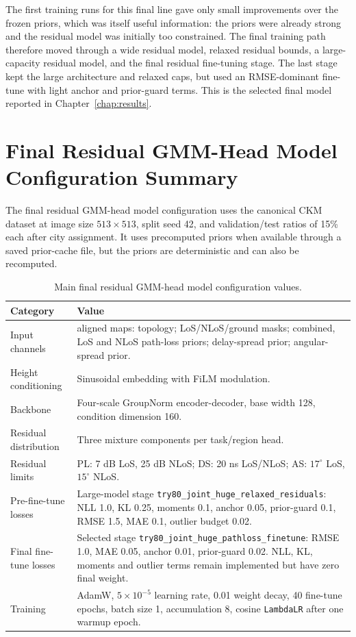 The first training runs for this final line gave only small improvements over the frozen
priors, which was itself useful information: the priors were already strong
and the residual model was initially too constrained. The final training path
therefore moved through a wide residual model, relaxed residual bounds, a
large-capacity residual model, and the final residual fine-tuning stage. The
last stage kept the large architecture and relaxed caps, but used an
RMSE-dominant fine-tune with light anchor and prior-guard terms. This is the
selected final model reported in Chapter~\ref{chap:results}.

\chapter{Final Residual GMM-Head Model Configuration Summary}

The final residual GMM-head model configuration uses the canonical CKM dataset at image
size \(513\times513\), split seed 42, and validation/test ratios of 15\% each
after city assignment. It uses
precomputed priors when available through a saved prior-cache file, but the
priors are deterministic and can also be recomputed.

\begin{table}[H]
\centering
\caption{Main final residual GMM-head model configuration values.}
\label{tab:try80_config_appendix}
\begingroup
\footnotesize
\setlength{\tabcolsep}{5pt}
\renewcommand{\arraystretch}{1.16}
\begin{tabularx}{\textwidth}{@{}>{\raggedright\arraybackslash}p{3.15cm}>{\raggedright\arraybackslash}X@{}}
\toprule
Category & Value \\
\midrule
Input channels & 9 aligned maps: topology; LoS/NLoS/ground masks; combined,
LoS and NLoS path-loss priors; delay-spread prior; angular-spread prior. \\
Height conditioning & Sinusoidal embedding with FiLM modulation. \\
Backbone & Four-scale GroupNorm encoder-decoder, base width 128, condition
dimension 160. \\
Residual distribution & Three mixture components per task/region head. \\
Residual limits & PL: 7 dB LoS, 25 dB NLoS; DS: 20 ns LoS/NLoS; AS:
\(17^\circ\) LoS, \(15^\circ\) NLoS. \\
Pre-fine-tune losses & Large-model stage
\texttt{try80\_joint\_huge\_relaxed\_residuals}: NLL 1.0, KL 0.25,
moments 0.1, anchor 0.05, prior-guard 0.1, RMSE 1.5, MAE 0.1, outlier
budget 0.02. \\
Final fine-tune losses & Selected stage
\texttt{try80\_joint\_huge\_pathloss\_finetune}: RMSE 1.0, MAE 0.05,
anchor 0.01, prior-guard 0.02. NLL, KL, moments and outlier terms remain
implemented but have zero final weight. \\
Training & AdamW, \(5\times10^{-5}\) learning rate, 0.01 weight decay, 40
fine-tune epochs, batch size 1, accumulation 8, cosine \texttt{LambdaLR} after
one warmup epoch. \\
\bottomrule
\end{tabularx}
\endgroup
\end{table}

